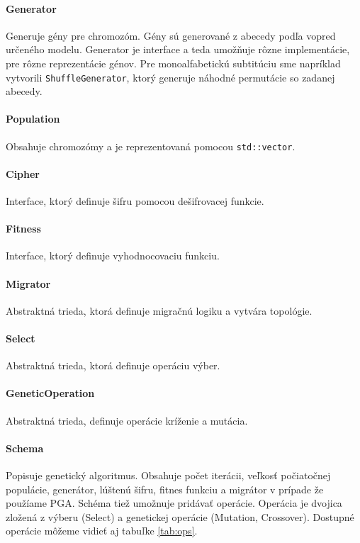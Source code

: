 \paragraph{Generator} Generuje gény pre chromozóm. Gény sú generované z abecedy podľa vopred určeného modelu.
Generator je interface a teda umožňuje rôzne implementácie, pre rôzne reprezentácie génov.
Pre monoalfabetickú subtitúciu sme napríklad vytvorili \texttt{ShuffleGenerator}, ktorý generuje náhodné permutácie so zadanej abecedy.
\paragraph{Population} Obsahuje chromozómy a je reprezentovaná pomocou \texttt{std::vector}.
\paragraph{Cipher} Interface, ktorý definuje šifru pomocou dešifrovacej funkcie.
\paragraph{Fitness} Interface, ktorý definuje vyhodnocovaciu funkciu.
\paragraph{Migrator} Abstraktná trieda, ktorá definuje migračnú logiku a vytvára topológie.
\paragraph{Select} Abstraktná trieda, ktorá definuje operáciu výber.
\paragraph{GeneticOperation} Abstraktná trieda, definuje operácie kríženie a mutácia.
\paragraph{Schema} Popisuje genetický algoritmus.
Obsahuje počet iterácii, veľkosť počiatočnej populácie, generátor, lúštenú šifru, fitnes funkciu a migrátor v prípade že použíame PGA.
Schéma tiež umožnuje pridávať operácie.
Operácia je dvojica zložená z výberu (Select) a genetickej operácie (Mutation, Crossover).
Dostupné operácie môžeme vidieť aj tabuľke \ref{tab:ops}.

